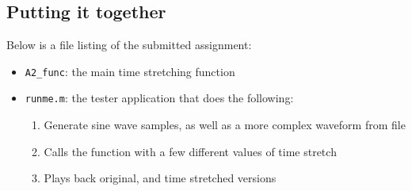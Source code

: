 \documentclass[12pt]{article}
\begin{document}
\subsection*{Putting it together}
Below is a file listing of the submitted assignment:
\begin{itemize}
\item \verb|A2_func|: the main time stretching function
\item \verb|runme.m|: the tester application that does the following:
\begin{enumerate}
	\item 	Generate sine wave samples, as well as a more complex waveform from file
	\item   Calls the function with a few different values of time stretch
	\item	Plays back original, and time stretched versions
\end{enumerate}
\end{itemize}
\end{document}
